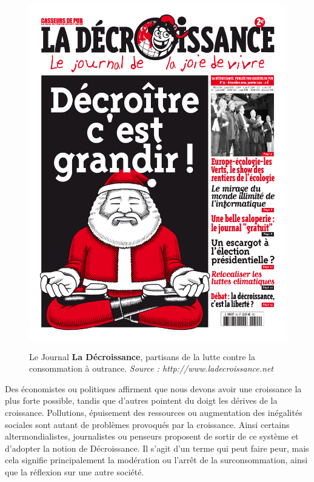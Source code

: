 \begin{figure}
~\includegraphics[scale=0.11]{Rsc/journal_La-Decroissance.jpg} 
\caption{Le Journal \textbf{La Décroissance}, partisans de la lutte contre la consommation à outrance. \textit{Source : http://www.ladecroissance.net}}
\label{journalDecroissance}
\end{figure} 


\bigbreak
Des économistes ou politiques affirment que nous devons avoir une croissance la plus forte possible, tandis que d'autres pointent du doigt les dérives de la croissance. Pollutions, épuisement des ressources ou augmentation des inégalités sociales sont autant de problèmes provoqués par la croissance. Ainsi certains altermondialistes, journalistes ou penseurs proposent de sortir de ce système et d'adopter la notion de Décroissance. Il s'agit d'un terme qui peut faire peur, mais cela signifie principalement la modération ou l'arrêt de la surconsommation, ainsi que la réflexion sur une autre société.





